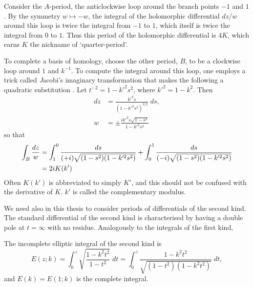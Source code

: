 
Consider the $A$-period, the anticlockwise loop around the branch points $-1$ and $1$. By the symmetry $w \mapsto -w$, the integral of the holomorphic differential $dz / w $ around this loop is twice the integral from $-1$ to $1$, which itself is twice the integral from $0$ to $1$. Thus this period of the holomorphic differential is $4K$, which earns $K$ the nickname of `quarter-period'.


To complete a basis of homology, choose the other period, $B$, to be a clockwise loop around $1$ and $k^{-1}$. To compute the integral around this loop, one employs a trick called {\emph Jacobi's imaginary transformation} that makes the following a quadratic substitution \cite{Whittaker2000}. Let $t^{-2} = 1-k'^2 s^2$, where $k'^2 = 1 - k^2$. Then
\begin{align*}
dz &= \frac{k'^2 s}{(1-k'^2 s^2)^{3/2}}\;ds, \\
w &= \pm \frac{i k'^2 s \sqrt {1-s^2}}{1-k'^2 s^2}
\end{align*}
so that
\begin{align*}
\int_B \frac{dz}{w}
&= \int_1^0 \frac{ds}{(+i)\sqrt{(1-s^2)(1-k'^2 s^2)}} + \int_0^1 \frac{ds}{(-i)\sqrt{(1-s^2)(1-k'^2 s^2)}}\\
&= 2i K(k')
\end{align*}
Often $K(k')$ is abbreviated to simply $K'$, and this should not be confused with the derivative of $K$. $k'$ is called the complementary modulus.


We need also in this thesis to consider periods of differentials of the second kind. The standard differential of the second kind is characterised by having a double pole at $t=\infty$ with no residue. Analogously to the integrals of the first kind,

\begin{defn}
The incomplete elliptic integral of the second kind is
\[
E(z;k) = \int_0^z \sqrt{\frac{1-k^2 t^2}{1-t^2}} \;dt = \int_0^z \frac{1-k^2 t^2}{\sqrt{(1-t^2)(1-k^2 t^2)}}\;dt,
\]
and $E(k) = E(1;k)$ is the complete integral.
\end{defn}

